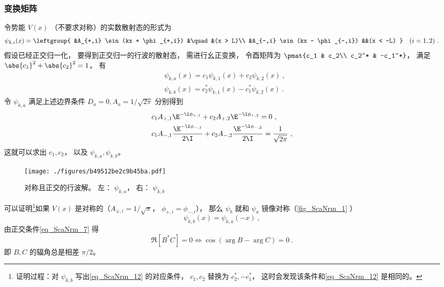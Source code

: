 \subsubsection{变换矩阵}
令势能 $V(x)$ （不要求对称）的实数散射态的形式为
\begin{equation}
\psi_{k,i}(x) = \leftgroup{
    &A_{+,i} \sin(kx + \phi_{+,i}) &\quad &(x > L)\\
    &A_{-,i} \sin(kx - \phi_{-,i}) &&(x < -L)
} \quad (i = 1,2)~.
\end{equation}
假设已经正交归一化， 要得到正交归一的行波的散射态， 需进行幺正变换， 令酉矩阵为 $\pmat{c_1 & c_2\\ c_2^* & -c_1^*}$， 满足 $\abs{c_1}^2 + \abs{c_2}^2 = 1$， 有
\begin{equation}
\begin{aligned}
&\psi_{k,a}(x) = c_1\psi_{k,1}(x) + c_2\psi_{k,2}(x)~,\\
&\psi_{k,b}(x) = c_2^*\psi_{k,1}(x) - c_1^*\psi_{k,2}(x)~.
\end{aligned}
\end{equation}
令 $\psi_{k,a}$ 满足上述边界条件 $D_a = 0, A_a = 1/\sqrt{2\pi}$ 分别得到
\begin{equation}\label{eq_ScaNrm_12}
\begin{aligned}
&c_1 A_{+,1}\E^{-\I\phi_{+,1}} + c_2 A_{+,2}\E^{-\I\phi_{+,2}} = 0~,\\
&c_1 A_{-,1}\frac{\E^{-\I\phi_{-,1}}}{2\I} + c_2 A_{-,2}\frac{\E^{-\I\phi_{-,2}}}{2\I} = \frac{1}{\sqrt{2\pi}}~,
\end{aligned}
\end{equation}
这就可以求出 $c_1, c_2$， 以及 $\psi_{k,a}, \psi_{k,b}$。

\begin{figure}[ht]
\centering
\texttt{[image: ./figures/b49512be2c9b45ba.pdf]}
\caption{对称且正交的行波解。 左： $\psi_{k,a}$， 右： $\psi_{k,b}$} \label{fig_ScaNrm_1}
\end{figure}

可以证明\footnote{证明过程：对 $\psi_{k,b}$ 写出\autoref{eq_ScaNrm_12} 的对应条件， $c_1,c_2$ 替换为 $c_2^*, -c_1^*$， 这时会发现该条件和\autoref{eq_ScaNrm_12} 是相同的。}如果 $V(x)$ 是对称的（$A_{\pm,i} = 1/\sqrt{\pi}$， $\phi_{+,i}=\phi_{-,i}$）， 那么 $\psi_b$ 就和 $\psi_a$ 镜像对称（\autoref{fig_ScaNrm_1} ）
\begin{equation}
\psi_{k,b}(x) = \psi_{k,a}(-x)~,
\end{equation}
由正交条件\autoref{eq_ScaNrm_7} 得
\begin{equation}\label{eq_ScaNrm_11}
\Re[B^*C] = 0 \Longleftrightarrow \cos(\arg{B} - \arg{C}) = 0~.
\end{equation}
即 $B,C$ 的辐角总是相差 $\pi/2$。

